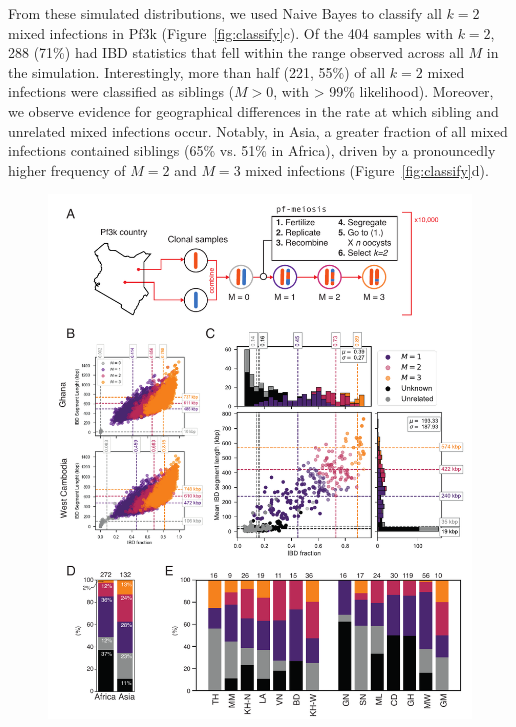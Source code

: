 \documentclass[9pt,lineno]{elife}
\begin{document}
From these simulated distributions, we used Naive Bayes to classify all $k=2$ mixed infections in Pf3k (Figure~\ref{fig:classify}c).  Of the 404 samples with $k=2$, 288 (71\%) had IBD statistics that fell within the range observed across all $M$ in the simulation. Interestingly, more than half (221, 55\%) of all $k=2$ mixed infections were classified as siblings ($M > 0$, with > 99\% likelihood).  Moreover, we observe evidence for geographical differences in the rate at which sibling and unrelated mixed infections occur. Notably, in Asia, a greater fraction of all mixed infections contained siblings (65\% vs. 51\% in Africa), driven by a pronouncedly higher frequency of $M=2$ and $M=3$ mixed infections (Figure~\ref{fig:classify}d).


\begin{figure}[h]
  \begin{center}
  \includegraphics[width=\textwidth]{figures/Fig4-v3.pdf}

\end{center}
\end{figure}
\end{document}
